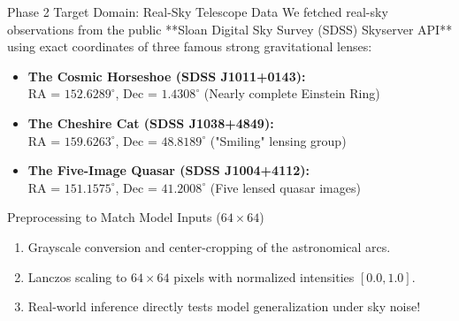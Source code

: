 \documentclass[10pt]{beamer}
\begin{document}
\begin{frame}{Phase 2 Target Domain: Real-Sky Telescope Data}
    We fetched real-sky observations from the public **Sloan Digital Sky Survey (SDSS) Skyserver API** using exact coordinates of three famous strong gravitational lenses:
    \vspace{0.2cm}
    \begin{itemize}
        \item \textbf{The Cosmic Horseshoe (SDSS J1011+0143):} \\ RA = $152.6289^\circ$, Dec = $1.4308^\circ$ (Nearly complete Einstein Ring)
        \item \textbf{The Cheshire Cat (SDSS J1038+4849):} \\ RA = $159.6263^\circ$, Dec = $48.8189^\circ$ ("Smiling" lensing group)
        \item \textbf{The Five-Image Quasar (SDSS J1004+4112):} \\ RA = $151.1575^\circ$, Dec = $41.2008^\circ$ (Five lensed quasar images)
    \end{itemize}
    \vspace{0.2cm}
    \begin{block}{Preprocessing to Match Model Inputs ($64 \times 64$)}
        \begin{enumerate}
            \item Grayscale conversion and center-cropping of the astronomical arcs.
            \item Lanczos scaling to $64 \times 64$ pixels with normalized intensities $[0.0, 1.0]$.
            \item Real-world inference directly tests model generalization under sky noise!
        \end{enumerate}
    \end{block}
\end{frame}
\end{document}
